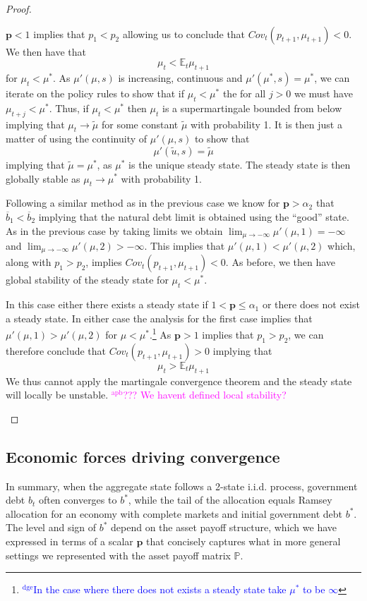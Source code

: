 \documentclass[12pt]{article}
\newcommand{\dge}[1]{\textcolor{blue}{$^{\textrm{dge}}${#1}}}
\newcommand{\apb}[1]{\textcolor{magenta}{$^{\textrm{apb}}${#1}}}
\newcommand{\EE}{\mathbb E}
\begin{document}
\begin{proof}
{\begin{description}
	$\bm p < 1$ implies that $p_1 < p_2$ allowing us to conclude that $Cov_t(p_{t+1},\mu_{t+1}) < 0$.  We then have that 
	\[
		\mu_t < \EE_t\mu_{t+1}
	\] for $\mu_t < \mu^*$.  As $\mu'(\mu,s)$ is increasing, continuous and $\mu'(\mu^*,s) = \mu^*$, we can iterate on the policy rules to show that if $\mu_t < \mu^*$ the for all $j> 0$ we must have $\mu_{t+j} <\mu^*$.  Thus, if $\mu_t <\mu^*$ then $\mu_t$ is a supermartingale bounded from below implying that $\mu_t\rightarrow \tilde\mu$ for some constant $\tilde\mu$ with probability 1.  It is then just a matter of using the continuity of $\mu'(\mu,s)$ to show that 
	\[
		\mu'(\tilde u,s) = \tilde \mu
	\] implying that $\tilde \mu =\mu^*$, as $\mu^*$ is the unique steady state.  The steady state is then globally stable as $\mu_t \rightarrow \mu^*$ with probability 1.
	\item[2. $\bm p \geq \alpha_2$:]  Following a similar method as in the previous case we know for $\bm p > \alpha_2$ that $\overline b_1 < \overline b_2$ implying that the natural debt limit is obtained using the ``good'' state.  As in the previous case by taking limits we obtain $\lim_{\mu\rightarrow-\infty} \mu'(\mu,1) = -\infty$ and $\lim_{\mu\rightarrow-\infty}\mu'(\mu,2) > -\infty$.  This implies that $\mu'(\mu,1) < \mu'(\mu,2)$ which, along with $p_1 > p_2$, implies $Cov_t(p_{t+1},\mu_{t+1}) <0$.  As before, we then have global stability of the steady state for $\mu_t < \mu^*$.
	\item[3. $\min(\alpha_1,1) < \bm p < \alpha_2$:]   In this case either there exists a steady state if $1 < \bm p \leq \alpha_1$ or there does not exist a steady state.  In either case the analysis for the first case implies that $\mu'(\mu,1) > \mu'(\mu,2)$ for $\mu < \mu ^*$.\footnote{\dge{In the case where there does not exists a steady state take $\mu^*$ to be $\infty$}}  As $\bm p >1$ implies that $p_1 > p_2$, we can therefore conclude that $Cov_t(p_{t+1},\mu_{t+1}) > 0$ implying that 
	\[
		\mu_t > \EE_t \mu_{t+1}
	\]We thus cannot apply the martingale convergence theorem and the steady state will locally be unstable. \apb{??? We havent defined local stability? }
\end{description} }
\end{proof}




\subsection{Economic forces driving convergence}
In summary, when the aggregate state follows a 2-state i.i.d. process, government debt  $b_t$ often converges to $b^*$, while
the tail of the allocation equals  Ramsey allocation for an economy with complete markets and initial government  debt $b^*$.
  The level  and sign of $b^*$ depend on the asset payoff structure, which we have  expressed in terms of a  scalar
  $\bm{p}$ that concisely captures what in more general settings we represented with the asset payoff matrix $\mathbb{P}$.
\end{document}

